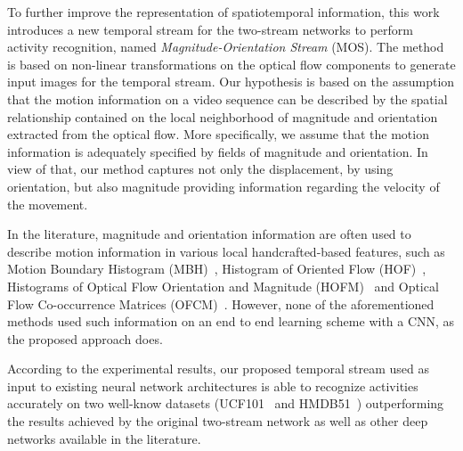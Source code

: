 \documentclass[10pt,conference]{IEEEtran}
\begin{document}
To further improve the representation of spatiotemporal information, this work introduces a new temporal stream for the two-stream networks to perform activity recognition, named \emph{Magnitude-Orientation Stream} (MOS). The method is based on non-linear transformations on the optical flow components to generate input images for the temporal stream. Our hypothesis is based on the assumption that the motion information on a video sequence can be described by the spatial relationship contained on the local neighborhood of magnitude and orientation extracted from the optical flow. More specifically, we assume that the motion information is adequately specified by fields of magnitude and orientation. In view of that, our method captures not only the displacement, by using orientation, but also magnitude providing information regarding the velocity of the movement. 

In the literature, magnitude and orientation information are often used to describe motion information  in various local  handcrafted-based features, such as Motion Boundary Histogram (MBH)~\cite{Dalal:2006}, Histogram of Oriented Flow (HOF)~\cite{Laptev:2008}, Histograms of Optical Flow Orientation and Magnitude (HOFM)~\cite{Colque:2015} and Optical Flow Co-occurrence Matrices (OFCM)~\cite{Caetano:2016}. However, none of the aforementioned methods used such information on an end to end learning scheme with a CNN, as the proposed approach does.


According to the experimental results, our proposed temporal stream used as input to existing neural network architectures is able to recognize activities accurately on two well-know datasets (UCF101~\cite{Soomro:2012} and HMDB51~\cite{Kuehne:2011}) outperforming the results achieved by the original two-stream network as well as other deep networks available in the literature.
\end{document}

